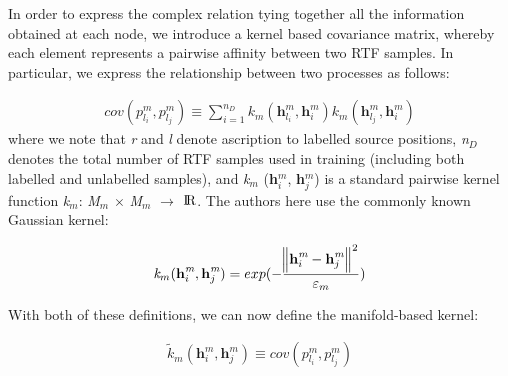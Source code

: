 \documentclass{article}
\begin{document}
In order to express the complex relation tying together all the information obtained at each node, we introduce a kernel based covariance matrix, whereby each element represents a pairwise affinity between two RTF samples. In particular, we express the relationship between two processes as follows: 

\begin{equation} \label{cov_element}
    \begin{aligned}
        cov(\textit{{p}$_{l_i}^m$}, \textit{{p}$_{l_j}^m$}) \equiv \displaystyle\sum_{i=1}^{{n}_D} \textit{{k}$_m$}(\textbf{h}_{l_i}^\textit{m},\textbf{h}_i^\textit{m})\textit{{k}$_m$}(\textbf{h}_{l_j}^\textit{m}, \textbf{h}_i^\textit{m})
    \end{aligned}
\end{equation} where we note that \textit{r} and \textit{l} denote ascription to labelled source positions, \textit{n$_D$} denotes the total number of RTF samples used in training (including both labelled and unlabelled samples), and \textit{k$_m$} (\textbf{h}$_i^\textit{m}$, \textbf{h}$_j^\textit{m}$) is a standard pairwise kernel function \textit{k$_m$}: \textit{M$_m$} $\times$ \textit{M}$_m$ $\rightarrow$ ${\rm I\!R}$. The authors here use the commonly known Gaussian kernel:

\begin{equation} \label{gauss_kern}
    \begin{aligned}
        \textit{k$_m$}(\textbf{h}_i^\textit{m}, \textbf{h}_j^\textit{m}) = exp(-\frac{\norm{\textbf{h}_i^\textit{m} - \textbf{h}_j^\textit{m}}^2}{\textit{$\varepsilon_m$}})
    \end{aligned}
\end{equation}

With both of these definitions, we can now define the manifold-based kernel:

\begin{equation} \label{mani_kern}
    \begin{aligned}
        \textit{$\tilde{k}_m$}(\textbf{h}_i^\textit{m}, \textbf{h}_j^\textit{m}) \equiv cov(\textit{{p}$_{l_i}^m$}, \textit{{p}$_{l_j}^m$})
    \end{aligned}
\end{equation}
\end{document}
